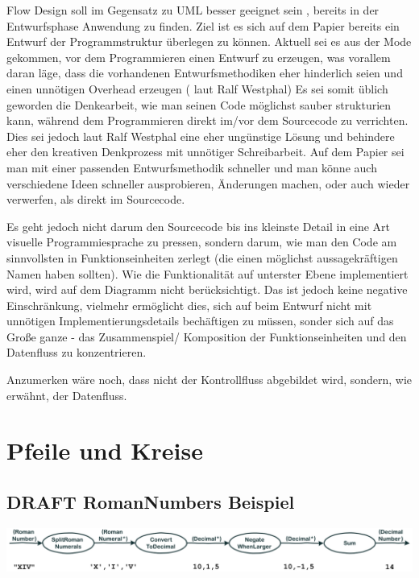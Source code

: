 \documentclass[11pt]{article}
\begin{document}
Flow Design soll im Gegensatz zu UML besser geeignet sein , bereits in der Entwurfsphase Anwendung zu finden.
Ziel ist es sich auf dem Papier bereits ein Entwurf der Programmstruktur überlegen zu können.
Aktuell sei es aus der Mode gekommen, vor dem Programmieren einen Entwurf zu erzeugen, was vorallem daran läge, dass die vorhandenen
Entwurfsmethodiken eher hinderlich seien und einen unnötigen Overhead erzeugen ( laut Ralf Westphal)
Es sei somit üblich geworden die Denkearbeit, wie man seinen Code möglichst sauber strukturien kann,
während dem Programmieren direkt im/vor dem Sourcecode zu verrichten.
Dies sei jedoch laut Ralf Westphal eine eher ungünstige Lösung und behindere eher den kreativen Denkprozess mit
unnötiger Schreibarbeit.
Auf dem Papier sei man mit einer passenden Entwurfsmethodik schneller und man könne auch verschiedene Ideen schneller
ausprobieren, Änderungen machen, oder auch wieder verwerfen, als direkt im Sourcecode.

Es geht jedoch nicht darum den Sourcecode bis ins kleinste Detail in eine Art visuelle Programmiesprache zu pressen,
sondern darum, wie man den Code am sinnvollsten in Funktionseinheiten zerlegt (die einen möglichst aussagekräftigen Namen haben sollten).
Wie die Funktionalität auf unterster Ebene implementiert wird, wird auf dem Diagramm nicht berücksichtigt.
Das ist jedoch keine negative Einschränkung, vielmehr ermöglicht dies, sich auf beim Entwurf nicht mit unnötigen Implementierungsdetails bechäftigen zu
müssen, sonder sich auf das Große ganze - das Zusammenspiel/ Komposition der Funktionseinheiten und den Datenfluss zu konzentrieren.

Anzumerken wäre noch, dass nicht der Kontrollfluss abgebildet wird, sondern, wie erwähnt, der Datenfluss.

\section{Pfeile und Kreise}
\label{sec:orgheadline4}
\subsection{{\bfseries\sffamily DRAFT} RomanNumbers Beispiel}
\label{sec:orgheadline2}

\includegraphics[width=.9\linewidth]{./img/FromRomanNumerals.png}
\end{document}
